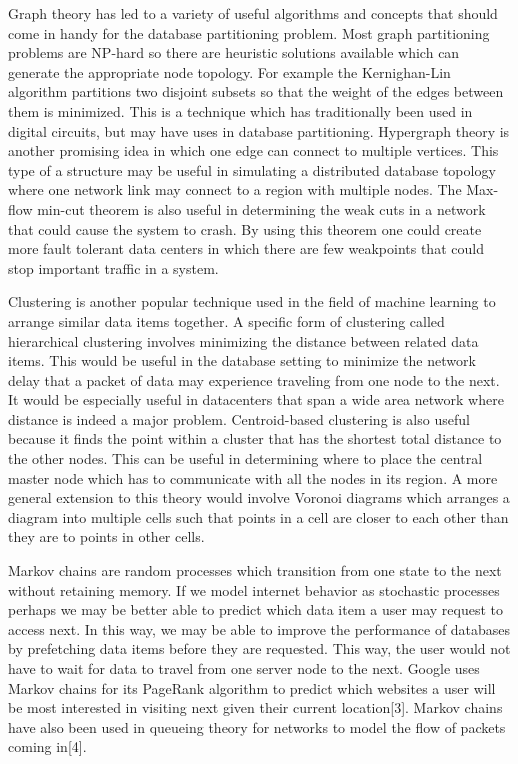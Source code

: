 \documentclass[10pt,final,journal]{IEEEtran}
\begin{document}
Graph theory has led to a variety of useful algorithms and concepts that should come in handy for the database partitioning problem.  Most graph partitioning problems are NP-hard so there are heuristic solutions available which can generate the appropriate node topology.  For example the Kernighan-Lin algorithm partitions two disjoint subsets so that the weight of the edges between them is minimized.  This is a technique which has traditionally been used in digital circuits, but may have uses in database partitioning.  Hypergraph theory is another promising idea in which one edge can connect to multiple vertices.  This type of a structure may be useful in simulating a distributed database topology where one network link may connect to a region with multiple nodes.  The Max-flow min-cut theorem is also useful in determining the weak cuts in a network that could cause the system to crash.  By using this theorem one could create more fault tolerant data centers in which there are few weakpoints that could stop important traffic in a system.

Clustering is another popular technique used in the field of machine learning to arrange similar data items together.  A specific form of clustering called hierarchical clustering involves minimizing the distance between related data items.  This would be useful in the database setting to minimize the network delay that a packet of data may experience traveling from one node to the next.  It would be especially useful in datacenters that span a wide area network where distance is indeed a major problem.  Centroid-based clustering is also useful because it finds the point within a cluster that has the shortest total distance to the other nodes.  This can be useful in determining where to place the central master node which has to communicate with all the nodes in its region.  A more general extension to this theory would involve Voronoi diagrams which arranges a diagram into multiple cells such that points in a cell are closer to each other than they are to points in other cells.

Markov chains are random processes which transition from one state to the next without retaining memory.  If we model internet behavior as stochastic processes perhaps we may be better able to predict which data item a user may request to access next.  In this way, we may be able to improve the performance of databases by prefetching data items before they are requested.  This way, the user would not have to wait for data to travel from one server node to the next.  Google uses Markov chains for its PageRank algorithm to predict which websites a user will be most interested in visiting next given their current location[3].  Markov chains have also been used in queueing theory for networks to model the flow of packets coming in[4].
\end{document}
